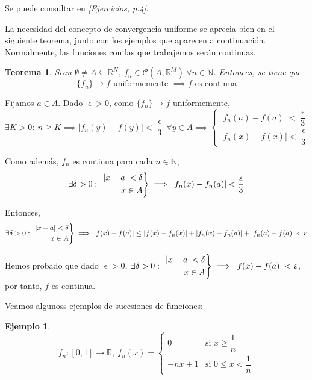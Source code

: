\documentclass[11pt, a4paper]{article}
\makeatletter
\newif\IfInSansMode
\let\oldsf\sffamily
\renewcommand*{\sffamily}{\oldsf\mathversion{sans}\InSansModetrue}
\let\oldnorm\normalfont
\renewcommand*{\normalfont}{\oldnorm\InSansModefalse\mathversion{normal}}
\let\epsilon\upvarepsilon
\providecommand{\abs}[1]{\lvert#1\rvert}
\newcommand{\R}{\mathbb{R}} \newcommand{\N}{\mathbb{N}}
\newcommand{\fn}{\{f_n\}}
\renewenvironment{proof}[1][\proofname] {\par\pushQED{\qed}\normalfont\topsep6\p@\@plus6\p@\relax\trivlist\item[\hskip\labelsep\itshape\sffamily#1\@addpunct{.}]\ignorespaces}{\popQED\endtrivlist\@endpefalse}
\theoremstyle{theorem-style}
\newtheorem{nth}{Teorema}[section]
\theoremstyle{definition-style}
\theoremstyle{remark-style}
\theoremstyle{example-style}
\newtheorem{ejemplo}{Ejemplo}[section]
\newenvironment{rcases}
{\left.\begin{aligned}}
    {\end{aligned}\right\rbrace}
\makeatother
\begin{document}
  \begin{proof}
    Se puede consultar en \textit{[Ejercicios, p.4]}.
  \end{proof}

La necesidad del concepto de convergencia uniforme se aprecia bien en el siguiente teorema, junto con los ejemplos que aparecen a continuación. Normalmente, las funciones con las que trabajemos serán continuas.

\begin{nth}
  \label{2}
  Sean $\emptyset \ne A \subseteq \R^N$, $f_n \in \mathcal{C}(A,\R^M)\ \forall n\in \N$. Entonces, se tiene que
  \[
    \fn \to f \text{ uniformemente } \implies f \text{ es continua}
  \]
\end{nth}

\begin{proof}
  Fijamos $a\in A$. Dado $\epsilon>0$, como $\fn\to f$ uniformemente,
  \[
    \exists K>0:\ n\ge K \implies \abs{f_n(y)-f(y)}<\dfrac{\epsilon}{3}\ \forall y\in A \implies \begin{cases}
      \abs{f_n(a)-f(a)}<\dfrac{\epsilon}{3}\\
      \abs{f_n(x)-f(x)}<\dfrac{\epsilon}{3}
    \end{cases}
  \]
  
  Como además, $f_n$ es continua para cada $n\in \N$,
  \[
    \exists \delta>0:\ \begin{rcases}
      \abs{x-a}<\delta\\
      x\in A
    \end{rcases} \implies \abs{f_n(x)-f_n(a)} < \dfrac{\epsilon}{3}
  \] 
  
  Entonces,
  \[
    \exists \delta>0:\ \begin{rcases}
      \abs{x-a}<\delta\\
      x\in A
    \end{rcases} \implies \abs{f(x)-f(a)} \le \abs{f(x)-f_n(x)} + \abs{f_n(x)-f_n(a)}+\abs{f_n(a)-f(a)} < \epsilon
  \]
  
  Hemos probado que dado $\epsilon > 0$, $\exists \delta>0:\ \begin{rcases}
    \abs{x-a}<\delta\\
    x\in A
  \end{rcases} \implies \abs{f(x)-f(a)}<\epsilon$, por tanto, $f$ es continua. 
\end{proof}

Veamos algunoss ejemplos de sucesiones de funciones:

\begin{ejemplo}
  \[
    f_n : [0,1] \to \R,\ f_n(x) = \begin{cases}
      0 & \text{si } x\ge \dfrac{1}{n}\\
      -nx+1 & \text{si } 0\le x < \dfrac{1}{n}
    \end{cases}
  \]
\end{ejemplo}
\end{document}
